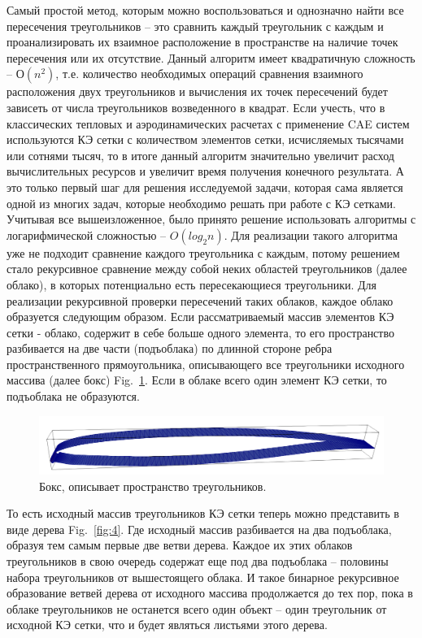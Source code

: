 \documentclass[
11pt,%
tightenlines,%
twoside,%
onecolumn,%
nofloats,%
nobibnotes,%
nofootinbib,%
superscriptaddress,%
noshowpacs,%
centertags]%
{revtex4}
\begin{document}
Самый простой метод, которым можно воспользоваться и однозначно найти все пересечения треугольников – это сравнить каждый треугольник с каждым и проанализировать их взаимное расположение в пространстве на наличие точек пересечения или их отсутствие. 
Данный алгоритм имеет квадратичную сложность – $О(n^2)$, т.е. количество необходимых операций сравнения взаимного расположения двух треугольников и вычисления их точек пересечений будет зависеть от числа треугольников возведенного в квадрат. Если учесть, что в классических тепловых и аэродинамических расчетах с применение CAE систем используются КЭ сетки с количеством элементов сетки, исчисляемых тысячами или сотнями тысяч, то в итоге данный алгоритм значительно увеличит расход вычислительных ресурсов и увеличит время получения конечного результата. А это только первый шаг для решения исследуемой задачи, которая сама является одной из многих задач, которые необходимо решать при работе с КЭ сетками.
Учитывая все вышеизложенное, было принято решение использовать алгоритмы с логарифмической сложностью – $O(log_2n)$. Для реализации такого алгоритма уже не подходит сравнение каждого треугольника с каждым, потому решением стало рекурсивное сравнение между собой неких областей треугольников (далее облако), в которых потенциально есть пересекающиеся треугольники.
Для реализации рекурсивной проверки пересечений таких облаков, каждое облако образуется следующим образом. Если рассматриваемый массив элементов КЭ сетки - облако, содержит в себе больше одного элемента, то его пространство разбивается на две части (подъоблака) по длинной стороне ребра пространственного прямоугольника, описывающего все треугольники исходного массива (далее бокс) Fig.~\ref{fig:3}. Если в облаке всего один элемент КЭ сетки, то подъоблака не образуются.

\begin{figure}[h]
\includegraphics[width=1.0\textwidth]{pics/pic_3.png}
\caption{Бокс, описывает пространство треугольников.}\label{fig:3}
\end{figure}

То есть исходный массив треугольников КЭ сетки теперь можно представить в виде дерева Fig.~\ref{fig:4}. Где исходный массив разбивается на два подъоблака, образуя тем самым первые две ветви дерева. Каждое их этих облаков треугольников в свою очередь содержат еще под два подъоблака – половины набора треугольников от вышестоящего облака. И такое бинарное рекурсивное образование ветвей дерева от исходного массива продолжается до тех пор, пока в облаке треугольников не останется всего один объект – один треугольник от исходной КЭ сетки, что и будет являться листьями этого дерева. 
\end{document}
